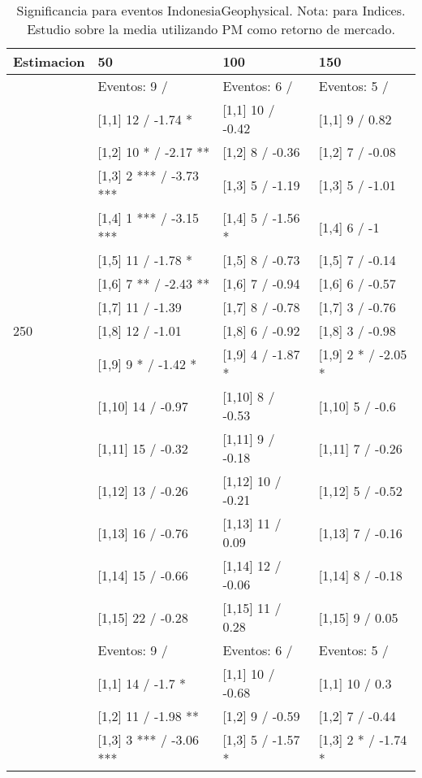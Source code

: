 \begin{table}

\caption{Significancia para eventos IndonesiaGeophysical. Nota: para Indices. Estudio sobre la media utilizando PM como retorno de mercado.}
\centering
\begin{tabular}[t]{llll}
\toprule
Estimacion & 50 & 100 & 150\\
\midrule
 & Eventos:  9 / & Eventos:  6 / & Eventos:  5 /\\
 & {}[1,1] 12  / -1.74 * & {}[1,1] 10  / -0.42 & {}[1,1] 9  / 0.82\\
 & {}[1,2] 10 * / -2.17 ** & {}[1,2] 8  / -0.36 & {}[1,2] 7  / -0.08\\
 & {}[1,3] 2 *** / -3.73 *** & {}[1,3] 5  / -1.19 & {}[1,3] 5  / -1.01\\
 & {}[1,4] 1 *** / -3.15 *** & {}[1,4] 5  / -1.56 * & {}[1,4] 6  / -1\\
\addlinespace
 & {}[1,5] 11  / -1.78 * & {}[1,5] 8  / -0.73 & {}[1,5] 7  / -0.14\\
 & {}[1,6] 7 ** / -2.43 ** & {}[1,6] 7  / -0.94 & {}[1,6] 6  / -0.57\\
 & {}[1,7] 11  / -1.39 & {}[1,7] 8  / -0.78 & {}[1,7] 3  / -0.76\\
250 & {}[1,8] 12  / -1.01 & {}[1,8] 6  / -0.92 & {}[1,8] 3  / -0.98\\
 & {}[1,9] 9 * / -1.42 * & {}[1,9] 4  / -1.87 * & {}[1,9] 2 * / -2.05 *\\
\addlinespace
 & {}[1,10] 14  / -0.97 & {}[1,10] 8  / -0.53 & {}[1,10] 5  / -0.6\\
 & {}[1,11] 15  / -0.32 & {}[1,11] 9  / -0.18 & {}[1,11] 7  / -0.26\\
 & {}[1,12] 13  / -0.26 & {}[1,12] 10  / -0.21 & {}[1,12] 5  / -0.52\\
 & {}[1,13] 16  / -0.76 & {}[1,13] 11  / 0.09 & {}[1,13] 7  / -0.16\\
 & {}[1,14] 15  / -0.66 & {}[1,14] 12  / -0.06 & {}[1,14] 8  / -0.18\\
\addlinespace
 & {}[1,15] 22  / -0.28 & {}[1,15] 11  / 0.28 & {}[1,15] 9  / 0.05\\
 & Eventos:  9 / & Eventos:  6 / & Eventos:  5 /\\
 & {}[1,1] 14  / -1.7 * & {}[1,1] 10  / -0.68 & {}[1,1] 10  / 0.3\\
 & {}[1,2] 11  / -1.98 ** & {}[1,2] 9  / -0.59 & {}[1,2] 7  / -0.44\\
 & {}[1,3] 3 *** / -3.06 *** & {}[1,3] 5  / -1.57 * & {}[1,3] 2 * / -1.74 *\\

\end{tabular}
\end{table}
